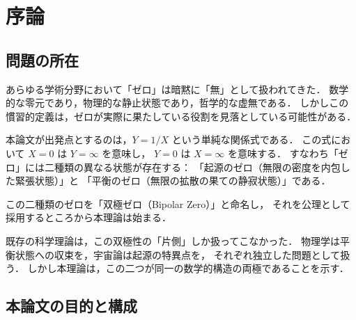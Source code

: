 \documentclass[12pt, a4paper]{article}
\theoremstyle{definition}
\newcommand{\Switch}{\Theta}
\begin{document}
\begin{titlepage}
\begin{abstract}
    閉じた系（球体内部 $S^-$）では共振のみが生じ，減衰は境界 $\partial S$
    の突破による外部との接触によってのみ可能となることを示す．
    また，ベクトルの大きさではなく「存在の有無」が次の作用の起動条件となる
    スイッチ関数 $\Switch(\mathbf{v})$ を定義し，
    異なる系をまたいだ連鎖作用の普遍的記述を可能にする．

    本理論は物理系・社会系・認知系・制度系を問わず同一の構造で記述可能であり，
    既存の散逸構造論・カタストロフ理論・情報理論との差異を明示しつつ，
    それらを包摂する上位構造として位置づけられる．

    \vspace{0.5em}
    \noindent\textbf{キーワード：}
    双極ゼロ，波動構造，存在スイッチ，基底非依存性，開放系，球体モデル，普遍理論
  \end{abstract}
\end{titlepage}

\tableofcontents
\newpage

\section{序論}

\subsection{問題の所在}

あらゆる学術分野において「ゼロ」は暗黙に「無」として扱われてきた．
数学的な零元であり，物理的な静止状態であり，哲学的な虚無である．
しかしこの慣習的定義は，ゼロが実際に果たしている役割を見落としている可能性がある．

本論文が出発点とするのは，$Y = 1/X$ という単純な関係式である．
この式において $X = 0$ は $Y = \infty$ を意味し，
$Y = 0$ は $X = \infty$ を意味する．
すなわち「ゼロ」には二種類の異なる状態が存在する：
「起源のゼロ（無限の密度を内包した緊張状態）」と
「平衡のゼロ（無限の拡散の果ての静寂状態）」である．

この二種類のゼロを「双極ゼロ（Bipolar Zero）」と命名し，
それを公理として採用するところから本理論は始まる．

既存の科学理論は，この双極性の「片側」しか扱ってこなかった．
物理学は平衡状態への収束を，宇宙論は起源の特異点を，
それぞれ独立した問題として扱う．
しかし本理論は，この二つが同一の数学的構造の両極であることを示す．

\subsection{本論文の目的と構成}
\end{document}
